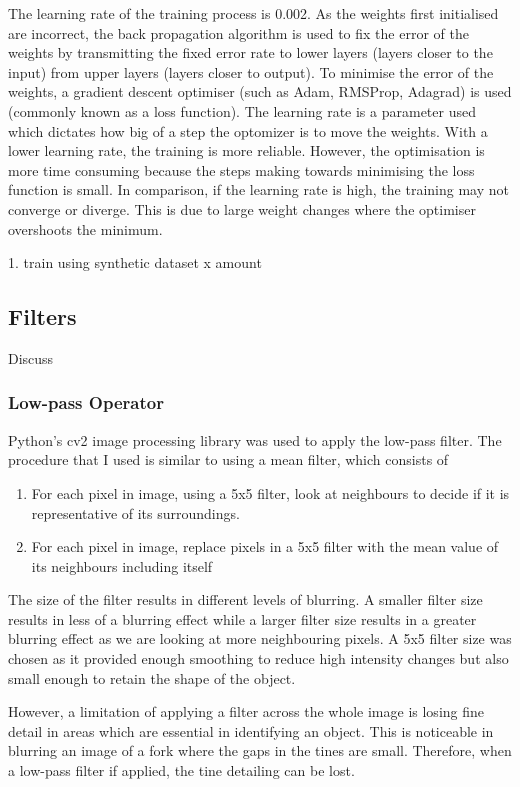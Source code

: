 The learning rate of the training process is 0.002. As the weights first initialised are incorrect, the back propagation algorithm is used to fix the error of the weights by transmitting the fixed error rate to lower layers (layers closer to the input) from upper layers (layers closer to output). To minimise the error of the weights, a gradient descent optimiser (such as Adam, RMSProp, Adagrad) is used (commonly known as a loss function). The learning rate is a parameter used which dictates how big of a step the optomizer is to move the weights. With a lower learning rate, the training is more reliable. However, the optimisation is more time consuming because the steps making towards minimising the loss function is small. In comparison, if the learning rate is high, the training may not converge or diverge. This is due to large weight changes where the optimiser overshoots the minimum.

1. train using synthetic dataset x amount


\subsection{Filters}
Discuss
\subsubsection{Low-pass Operator}

Python's cv2 image processing library was used to apply the low-pass filter. The procedure that I used is similar to using a mean filter, which consists of
\begin{enumerate}
	\item For each pixel in image, using a 5x5 filter, look at neighbours to decide if it is representative of its surroundings.
	\item For each pixel in image, replace pixels in a 5x5 filter with the mean value of its neighbours including itself
\end{enumerate}
The size of the filter results in different levels of blurring. A smaller filter size results in less of a blurring effect while a larger filter size results in a greater blurring effect as we are looking at more neighbouring pixels. A 5x5 filter size was chosen as it provided enough smoothing to reduce high intensity changes but also small enough to retain the shape of the object.

However, a limitation of applying a filter across the whole image is losing fine detail in areas which are essential in identifying an object. This is noticeable in blurring an image of a fork where the gaps in the tines are small. Therefore, when a low-pass filter if applied, the tine detailing can be lost.

